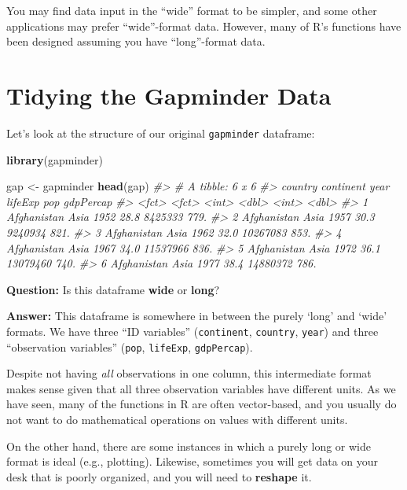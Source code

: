 \documentclass[
]{book}
\newenvironment{Shaded}{\begin{snugshade}}{\end{snugshade}}
\newcommand{\CommentTok}[1]{\textcolor[rgb]{0.56,0.35,0.01}{\textit{#1}}}
\newcommand{\KeywordTok}[1]{\textcolor[rgb]{0.13,0.29,0.53}{\textbf{#1}}}
\newcommand{\NormalTok}[1]{#1}
\newcommand{\StringTok}[1]{\textcolor[rgb]{0.31,0.60,0.02}{#1}}
\begin{document}
You may find data input in the ``wide'' format to be simpler, and some other applications may prefer ``wide''-format data. However, many of R's functions have been designed assuming you have ``long''-format data.

\hypertarget{tidying-the-gapminder-data}{%
\section{Tidying the Gapminder Data}\label{tidying-the-gapminder-data}}

Let's look at the structure of our original \texttt{gapminder} dataframe:

\begin{Shaded}
\begin{Highlighting}[]
\KeywordTok{library}\NormalTok{(gapminder)}

\NormalTok{gap <-}\StringTok{ }\NormalTok{gapminder}
\KeywordTok{head}\NormalTok{(gap)}
\CommentTok{#> # A tibble: 6 x 6}
\CommentTok{#>   country     continent  year lifeExp      pop gdpPercap}
\CommentTok{#>   <fct>       <fct>     <int>   <dbl>    <int>     <dbl>}
\CommentTok{#> 1 Afghanistan Asia       1952    28.8  8425333      779.}
\CommentTok{#> 2 Afghanistan Asia       1957    30.3  9240934      821.}
\CommentTok{#> 3 Afghanistan Asia       1962    32.0 10267083      853.}
\CommentTok{#> 4 Afghanistan Asia       1967    34.0 11537966      836.}
\CommentTok{#> 5 Afghanistan Asia       1972    36.1 13079460      740.}
\CommentTok{#> 6 Afghanistan Asia       1977    38.4 14880372      786.}
\end{Highlighting}
\end{Shaded}

\textbf{Question:} Is this dataframe \textbf{wide} or \textbf{long}?

\textbf{Answer:} This dataframe is somewhere in between the purely `long' and `wide' formats. We have three ``ID variables'' (\texttt{continent}, \texttt{country}, \texttt{year}) and three ``observation variables'' (\texttt{pop}, \texttt{lifeExp}, \texttt{gdpPercap}).

Despite not having \emph{all} observations in one column, this intermediate format makes sense given that all three observation variables have different units. As we have seen, many of the functions in R are often vector-based, and you usually do not want to do mathematical operations on values with different units.

On the other hand, there are some instances in which a purely long or wide format is ideal (e.g., plotting). Likewise, sometimes you will get data on your desk that is poorly organized, and you will need to \textbf{reshape} it.
\end{document}
